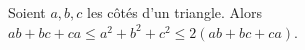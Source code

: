 Soient $a, b, c$ les côtés d'un triangle. Alors $ab + bc + ca \leq a^2 + b^2 + c^2 \leq 2(ab + bc + ca)$.
